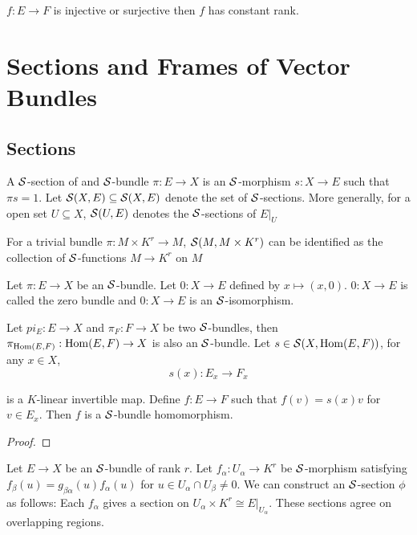 \begin{proposition}
	$f: E \to F$ is injective or surjective then $f$ has constant rank.
\end{proposition}

\section{Sections and Frames of Vector Bundles}

\subsection{Sections}

\begin{definition}[section]
	A $\mathcal{S}$-section of and $\mathcal{S}$-bundle $\pi: E \to X$ is an $\mathcal{S}$-morphism $s: X \to E$ such that $\pi s = 1$. Let $\mathcal{S}(X, E) \subseteq \mathcal{S}(X, E)$ denote the set of $\mathcal{S}$-sections. More generally, for a open set $U \subseteq X$, $\mathcal{S}(U, E)$ denotes the $\mathcal{S}$-sections of $E\vert_U$
\end{definition}

\begin{remark}
	For a trivial bundle $\pi: M \times K^r \to M$, $\mathcal{S}(M, M \times K^r)$ can be identified as the collection of $\mathcal{S}$-functions $M \to K^r$ on $M$
\end{remark}

\begin{remark}
	Let $\pi: E \to X$ be an $\mathcal{S}$-bundle. Let $0: X \to E$ defined by $x \mapsto (x, 0)$. $0: X \to E$ is called the zero bundle and $0: X \to E$ is an $\mathcal{S}$-isomorphism.
\end{remark}

\begin{proposition}
	Let $pi_E: E \to X$ and $\pi_F: F \to X$ be two $\mathcal{S}$-bundles, then $\pi_{\operatorname{Hom}(E, F)}: \operatorname{Hom}(E, F) \to X$ is also an $\mathcal{S}$-bundle. Let $s \in \mathcal{S}(X, \operatorname{Hom}(E, F))$, for any $x \in X$,
	$$
	s(x): E_x \to F_x
	$$
	
	is a $K$-linear invertible map. Define $f: E \to F$ such that $f(v) = s(x) v$ for $v \in E_x$. Then $f$ is a $\mathcal{S}$-bundle homomorphism.
	\begin{proof}
	\end{proof}
\end{proposition}

\begin{proposition}
	Let $E \to X$ be an $\mathcal{S}$-bundle of rank $r$. Let $f_\alpha: U_\alpha \to K^r$ be $\mathcal{S}$-morphism satisfying $f_\beta(u) = g_{\beta \alpha}(u) f_\alpha (u)$ for $u \in U_\alpha \cap U_\beta \neq 0$. We can construct an $\mathcal{S}$-section $\phi$ as follows: Each $f_\alpha$ gives a section on $U_\alpha \times K^r \cong E\vert_{U_\alpha}$. These sections agree on overlapping regions.
\end{proposition}


